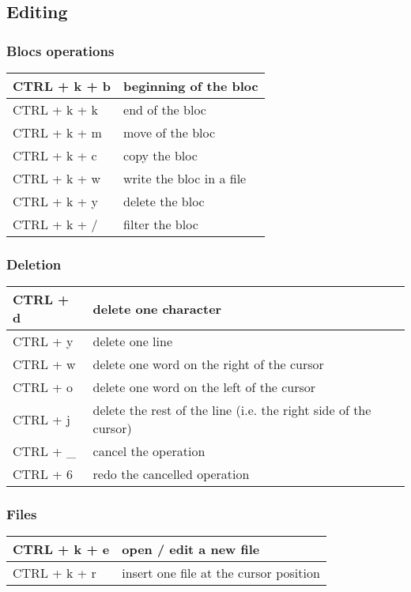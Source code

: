 \documentclass[letterpaper,10pt,english]{sphinxmanual}
\begin{document}
\subsection{Editing}
\label{editor/joe:editing}

\subsubsection{Blocs operations}
\label{editor/joe:blocs-operations}
\begin{tabulary}{\linewidth}{|L|L|}
\hline

CTRL + k + b
 & 
beginning of the bloc
\\
\hline
CTRL + k + k
 & 
end of the bloc
\\
\hline
CTRL + k + m
 & 
move of the bloc
\\
\hline
CTRL + k + c
 & 
copy the bloc
\\
\hline
CTRL + k + w
 & 
write the bloc in a file
\\
\hline
CTRL + k + y
 & 
delete the bloc
\\
\hline
CTRL + k + /
 & 
filter the bloc
\\
\hline\end{tabulary}



\subsubsection{Deletion}
\label{editor/joe:deletion}
\begin{tabulary}{\linewidth}{|L|L|}
\hline

CTRL + d
 & 
delete one character
\\
\hline
CTRL + y
 & 
delete one line
\\
\hline
CTRL + w
 & 
delete one word on the right of the cursor
\\
\hline
CTRL + o
 & 
delete one word on the left of the cursor
\\
\hline
CTRL + j
 & 
delete the rest of the line (i.e. the right side of the cursor)
\\
\hline
CTRL + \_
 & 
cancel the operation
\\
\hline
CTRL + 6
 & 
redo the cancelled operation
\\
\hline\end{tabulary}



\subsubsection{Files}
\label{editor/joe:files}
\begin{tabulary}{\linewidth}{|L|L|}
\hline

CTRL + k + e
 & 
open / edit a new file
\\
\hline
CTRL + k + r
 & 
insert one file at the cursor position
\\
\hline\end{tabulary}
\end{document}
